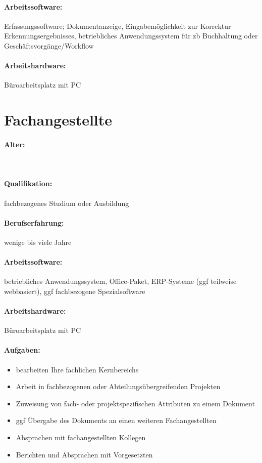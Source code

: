 \documentclass[11pt,oneside,a4paper,notitlepage]{article}
\begin{document}
\paragraph*{Arbeitssoftware: } Erfassungssoftware; Dokumentanzeige, Eingabemöglichkeit zur Korrektur Erkennungsergebnisses, 
betriebliches Anwendungssystem für zb Buchhaltung oder Geschäftsvorgänge/Workflow

%
\paragraph*{Arbeitshardware: } Büroarbeitsplatz mit PC

%
%
\section{Fachangestellte}
%
\paragraph*{Alter: }
\
%
\paragraph*{Qualifikation: } fachbezogenes Studium oder Ausbildung
%
\paragraph*{Berufserfahrung: } wenige bis viele Jahre
%
\paragraph*{Arbeitssoftware: } betriebliches Anwendungssystem, Office-Paket, ERP-Systeme (ggf teilweise webbasiert), ggf fachbezogene Spezialsoftware
%
\paragraph*{Arbeitshardware: } Büroarbeitsplatz mit PC
%
\paragraph*{Aufgaben: }
\begin{itemize}
\item bearbeiten Ihre fachlichen Kernbereichs
\item Arbeit in fachbezogenen oder Abteilungsübergreifenden Projekten
\item Zuweisung von fach- oder projektspezifischen Attributen zu einem Dokument
\item ggf Übergabe des Dokuments an einen weiteren Fachangestellten
\item Absprachen mit fachangestellten Kollegen
\item Berichten und Absprachen mit Vorgesetzten
\end{itemize}
\noindent
\end{document}
